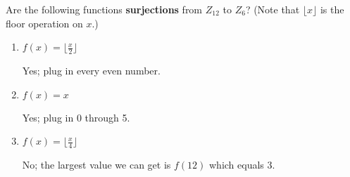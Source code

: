\question Are the following functions \textbf{surjections} from 
$Z_{12}$ to $Z_{6}$? (Note that $\lfloor x \rfloor$ is the floor 
operation on $x$.)
\begin{enumerate}[label=\alph*.]

\item $f(x) = \lfloor \frac{x}{2} \rfloor$
\begin{solution}[0.15 in]
Yes; plug in every even number. 
\end{solution}

\item $f(x) = x$
\begin{solution}[0.15 in]
Yes; plug in 0 through 5. 
\end{solution}

\item $f(x) = \lfloor \frac{x}{4} \rfloor$
\begin{solution}[0.15 in]
No; the largest value we can get is $f(12)$ which equals 3. 
\end{solution}
\end{enumerate}